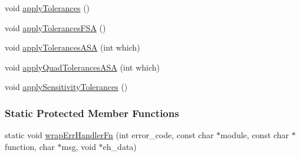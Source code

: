 \begin{DoxyCompactItemize}
\item 
void \mbox{\hyperlink{classamici_1_1_solver_a9819e5e5fa0d702721235eabd9e7c0e6}{apply\+Tolerances}} ()
\item 
void \mbox{\hyperlink{classamici_1_1_solver_a45ec22a0fddb6a8b37a3c3fdbdf7374f}{apply\+Tolerances\+F\+SA}} ()
\item 
void \mbox{\hyperlink{classamici_1_1_solver_abdf8989d57153fde8988e73a98979297}{apply\+Tolerances\+A\+SA}} (int which)
\item 
void \mbox{\hyperlink{classamici_1_1_solver_a09d47957ba70f725efb5e3a385a274a6}{apply\+Quad\+Tolerances\+A\+SA}} (int which)
\item 
void \mbox{\hyperlink{classamici_1_1_solver_a2d93ff630e5bb38f4bc6d8b47b46bd73}{apply\+Sensitivity\+Tolerances}} ()
\end{DoxyCompactItemize}
\subsubsection*{Static Protected Member Functions}
\begin{DoxyCompactItemize}
\item 
static void \mbox{\hyperlink{classamici_1_1_solver_a0040ff50d302fddc63a175cbb773d21e}{wrap\+Err\+Handler\+Fn}} (int error\+\_\+code, const char $\ast$module, const char $\ast$function, char $\ast$msg, void $\ast$eh\+\_\+data)
\end{DoxyCompactItemize}
